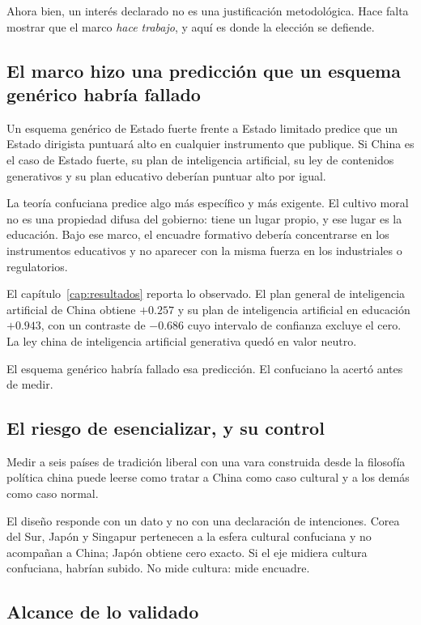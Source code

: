 Ahora bien, un interés declarado no es una justificación metodológica. Hace falta mostrar que el marco \textit{hace trabajo}, y aquí es donde la elección se defiende.

\subsection*{El marco hizo una predicción que un esquema genérico habría fallado}

Un esquema genérico de Estado fuerte frente a Estado limitado predice que un Estado dirigista puntuará alto en cualquier instrumento que publique. Si China es el caso de Estado fuerte, su plan de inteligencia artificial, su ley de contenidos generativos y su plan educativo deberían puntuar alto por igual.

La teoría confuciana predice algo más específico y más exigente. El cultivo moral no es una propiedad difusa del gobierno: tiene un lugar propio, y ese lugar es la educación. Bajo ese marco, el encuadre formativo debería concentrarse en los instrumentos educativos y no aparecer con la misma fuerza en los industriales o regulatorios.

El capítulo~\ref{cap:resultados} reporta lo observado. El plan general de inteligencia artificial de China obtiene $+0.257$ y su plan de inteligencia artificial en educación $+0.943$, con un contraste de $-0.686$ cuyo intervalo de confianza excluye el cero. La ley china de inteligencia artificial generativa quedó en valor neutro.

El esquema genérico habría fallado esa predicción. El confuciano la acertó antes de medir.

\subsection*{El riesgo de esencializar, y su control}

Medir a seis países de tradición liberal con una vara construida desde la filosofía política china puede leerse como tratar a China como caso cultural y a los demás como caso normal.

El diseño responde con un dato y no con una declaración de intenciones. Corea del Sur, Japón y Singapur pertenecen a la esfera cultural confuciana y no acompañan a China; Japón obtiene cero exacto. Si el eje midiera cultura confuciana, habrían subido. No mide cultura: mide encuadre.

\subsection*{Alcance de lo validado}

